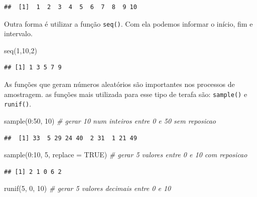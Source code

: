 \documentclass[
]{book}
\newenvironment{Shaded}{\begin{snugshade}}{\end{snugshade}}
\newcommand{\AttributeTok}[1]{\textcolor[rgb]{0.77,0.63,0.00}{#1}}
\newcommand{\CommentTok}[1]{\textcolor[rgb]{0.56,0.35,0.01}{\textit{#1}}}
\newcommand{\ConstantTok}[1]{\textcolor[rgb]{0.00,0.00,0.00}{#1}}
\newcommand{\DecValTok}[1]{\textcolor[rgb]{0.00,0.00,0.81}{#1}}
\newcommand{\FunctionTok}[1]{\textcolor[rgb]{0.00,0.00,0.00}{#1}}
\newcommand{\NormalTok}[1]{#1}
\newcommand{\SpecialCharTok}[1]{\textcolor[rgb]{0.00,0.00,0.00}{#1}}
\begin{document}
\begin{verbatim}
##  [1]  1  2  3  4  5  6  7  8  9 10
\end{verbatim}

Outra forma é utilizar a função \texttt{seq()}. Com ela podemos informar o início, fim e intervalo.

\begin{Shaded}
\begin{Highlighting}[]
\FunctionTok{seq}\NormalTok{(}\DecValTok{1}\NormalTok{,}\DecValTok{10}\NormalTok{,}\DecValTok{2}\NormalTok{)}
\end{Highlighting}
\end{Shaded}

\begin{verbatim}
## [1] 1 3 5 7 9
\end{verbatim}

As funções que geram números aleatórios são importantes nos processos de amostragem. as funções mais utilizada para esse tipo de terafa são: \texttt{sample()} e \texttt{runif()}.

\begin{Shaded}
\begin{Highlighting}[]
\FunctionTok{sample}\NormalTok{(}\DecValTok{0}\SpecialCharTok{:}\DecValTok{50}\NormalTok{, }\DecValTok{10}\NormalTok{) }\CommentTok{\# gerar 10 num inteiros entre 0 e 50 sem reposicao}
\end{Highlighting}
\end{Shaded}

\begin{verbatim}
##  [1] 33  5 29 24 40  2 31  1 21 49
\end{verbatim}

\begin{Shaded}
\begin{Highlighting}[]
\FunctionTok{sample}\NormalTok{(}\DecValTok{0}\SpecialCharTok{:}\DecValTok{10}\NormalTok{, }\DecValTok{5}\NormalTok{, }\AttributeTok{replace =} \ConstantTok{TRUE}\NormalTok{) }\CommentTok{\# gerar 5 valores entre 0 e 10 com reposicao}
\end{Highlighting}
\end{Shaded}

\begin{verbatim}
## [1] 2 1 0 6 2
\end{verbatim}

\begin{Shaded}
\begin{Highlighting}[]
\FunctionTok{runif}\NormalTok{(}\DecValTok{5}\NormalTok{, }\DecValTok{0}\NormalTok{, }\DecValTok{10}\NormalTok{) }\CommentTok{\# gerar 5 valores decimais entre 0 e 10}
\end{Highlighting}
\end{Shaded}
\end{document}
